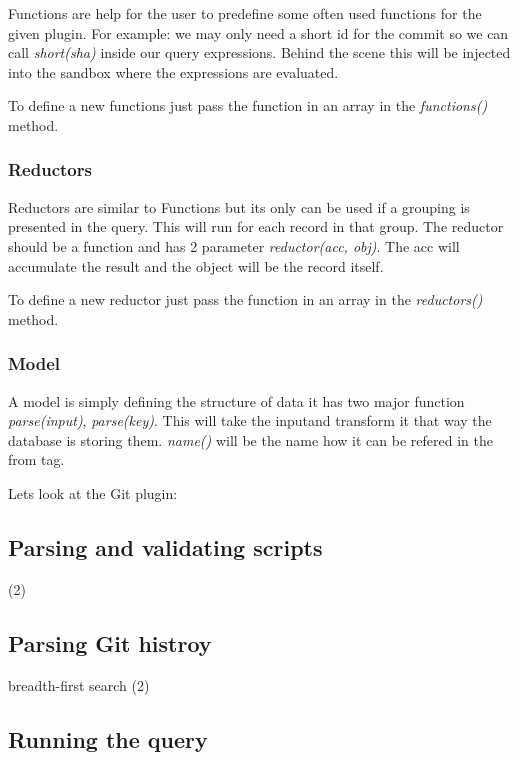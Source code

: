 Functions are help for the user to predefine some often used functions for the given plugin.
For example: we may only need a short id for the commit so we can call \textit{short(sha)} inside our query expressions.
Behind the scene this will be injected into the sandbox where the expressions are evaluated.

To define a new functions just pass the function in an array in the \textit{functions()} method.

\subsubsection{Reductors}

Reductors are similar to Functions but its only can be used if a grouping is presented in the query. This will
run for each record in that group. The reductor should be a function and has 2 parameter \textit{reductor(acc, obj)}.
The acc will accumulate the result and the object will be the record itself.

To define a new reductor just pass the function in an array in the \textit{reductors()} method.

\subsubsection{Model}

A model is simply defining the structure of data it has two major function \textit{parse(input)}, \textit{parse(key)}. 
This will take the inputand transform it that way the database is storing them. 
\textit{name()} will be the name how it can be refered in the from tag.

Lets look at the Git plugin:



\subsection{Parsing and validating scripts}

(2)

\subsection{Parsing Git histroy}

breadth-first search (2)

\subsection{Running the query}


